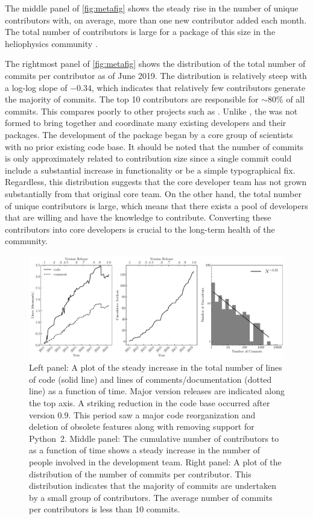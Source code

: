 The middle panel of \autoref{fig:metafig} shows the steady rise in the number of unique contributors with, on average, more than one new contributor added each month.
The total number of contributors is large for a package of this size in the heliophysics community \citep{pyhc2018}.

The rightmost panel of \autoref{fig:metafig} shows the distribution of the total number of commits per contributor as of June 2019.
The distribution is relatively steep with a log-log slope of $-0.34$, which indicates that relatively few contributors generate the majority of commits.
The top 10 contributors are responsible for ${\sim}80\%$ of all commits.
This compares poorly to other projects such as \astropy \citep{astropy2018}.
Unlike \astropy, the \sunpyproj was not formed to bring together and coordinate many existing developers and their \python packages.
The development of the \sunpypkg package began by a core group of scientists with no prior existing code base.
It should be noted that the number of commits is only approximately related to contribution size since a single commit could include a substantial increase in functionality or be a simple typographical fix.
Regardless, this distribution suggests that the core developer team has not grown substantially from that original core team.
On the other hand, the total number of unique contributors is large, which means that there exists a pool of \sunpypkg developers that are willing and have the knowledge to contribute.
Converting these contributors into core developers is crucial to the long-term health of the community.


\begin{figure}
    \center
    \includegraphics[width = 1.0\textwidth]{figures/dev_meta.pdf}
    \caption{Left panel: A plot of the steady increase in the total number of lines of code (solid line) and lines of comments/documentation (dotted line) as a function of time.
	Major version releases are indicated along the top axis.
	A striking reduction in the code base occurred after version 0.9.
	This period saw a major code reorganization and deletion of obsolete features along with removing support for Python~2.
	Middle panel: The cumulative number of contributors to \sunpypkg as a function of time shows a steady increase in the number of people involved in the development team.
	Right panel: A plot of the distribution of the number of commits per contributor.
	This distribution indicates that the majority of commits are undertaken by a small group of contributors. The average number of commits per contributors is less than 10 commits.}
\label{fig:metafig}
\end{figure}
